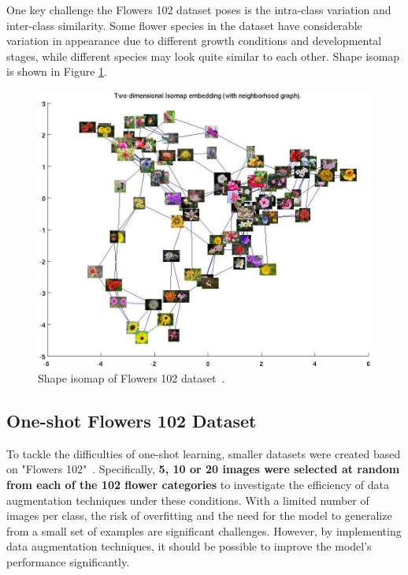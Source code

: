 One key challenge the Flowers 102 dataset poses is the intra-class variation and inter-class similarity. Some flower species in the dataset have considerable variation in appearance due to different growth conditions and developmental stages, while different species may look quite similar to each other. Shape isomap is shown in Figure \ref{fig:shapeIsomap}.

\begin{figure}[!htb]
    \centering
    \includegraphics[scale=0.3]{Images/shape-iso.jpg}
    \caption{Shape isomap of Flowers 102 dataset~\cite{Flowers102}.}
    \label{fig:shapeIsomap}
\end{figure}


\subsection{One-shot Flowers 102 Dataset}
\label{ssec:flowersOneShotDataset}

To tackle the difficulties of one-shot learning, smaller datasets were created based on "Flowers 102"~\cite{Flowers102}. Specifically, \textbf{5, 10 or 20 images were selected at random from each of the 102 flower categories} to investigate the efficiency of data augmentation techniques under these conditions. With a limited number of images per class, the risk of overfitting and the need for the model to generalize from a small set of examples are significant challenges. However, by implementing data augmentation techniques, it should be possible to improve the model's performance significantly. 



